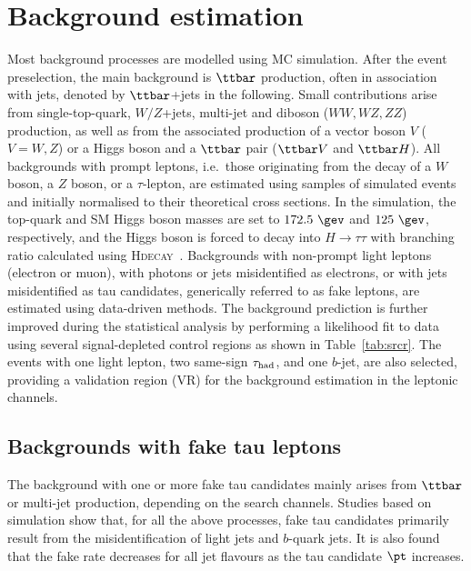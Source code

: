 \section{Background estimation}
\label{sec:background_model}

Most background processes are modelled using MC simulation.
After the event preselection, the main background is $\ttbar$ production, often in association with jets, denoted by $\ttbar$+jets in the following.
Small contributions arise from single-top-quark, $W/Z$+jets, multi-jet and diboson ($WW,WZ,ZZ$) production, as well as from the associated 
production of a vector boson $V$ ($V=W,Z$) or a Higgs boson and a $\ttbar$ pair ($\ttbar V$ and $\ttbar H$). All backgrounds 
with prompt leptons, i.e.\ those originating from the decay of a $W$ boson, a $Z$ boson, or a $\tau$-lepton,
are estimated using samples of simulated events and initially normalised to their theoretical cross sections.
In the simulation, the top-quark and SM Higgs boson masses are set to $172.5~\gev$ and $125~\gev$, respectively,
and the Higgs boson is forced to decay into $H\to \tau\tau$ with branching ratio calculated using \textsc{Hdecay}~\cite{Djouadi:1997yw}.  
Backgrounds with non-prompt light leptons (electron or muon), with photons or jets misidentified as electrons, or with jets misidentified as tau candidates, 
generically referred to as fake leptons, are estimated using data-driven methods. 
The background prediction is further improved during the statistical analysis by performing a likelihood 
fit to data using several signal-depleted control regions as shown in Table~\ref{tab:srcr}.
The events with one light lepton, two same-sign $\tau_{\mathrm{had}}$, and one $b$-jet, are also selected, providing a validation region (VR) for the background estimation in the leptonic channels. 
\subsection{Backgrounds with fake tau leptons}
\label{sec:faketaus}
The background with one or more fake tau candidates mainly arises from $\ttbar$ or
multi-jet production, depending on the search channels.
Studies based on simulation show that, for all the above processes, fake tau candidates primarily result from the
misidentification of light jets and $b$-quark jets.
It is also found that the fake rate decreases for all jet flavours as the tau candidate $\pt$ increases.

